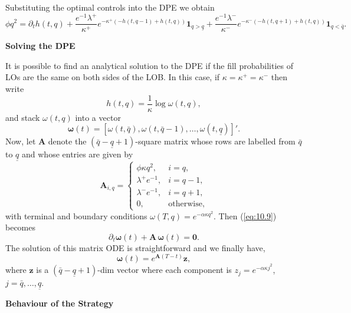 \documentclass[11pt, a4paper]{book}
\newcommand{\Ind}{\mathbf{1}}
\begin{document}
	Substituting the optimal controls into the DPE we obtain
	\begin{equation}
		\phi q^2 = \partial_t h(t, q) + \frac{e^{-1}\lambda^+}{\kappa^+} e^{-\kappa^+( -h(t,q-1)+h(t,q) )} \Ind_{q>\underline{q}} + \frac{e^{-1}\lambda^-}{\kappa^-} e^{-\kappa^-( -h(t,q+1)+h(t,q) )} \Ind_{q<\bar{q}}. \label{eq:10.9}
	\end{equation}
	
	\textbf{Solving the DPE}
	
	It is possible to find an analytical solution to the DPE if the fill probabilities of LOs are the same on both sides of the LOB. In this case, if $\kappa = \kappa^+ = \kappa^-$ then write
	\[
	h(t, q) = \frac{1}{\kappa} \log \omega(t, q),
	\]
	and stack $\omega(t, q)$ into a vector
	\[
	\bm{\omega}(t) = [\omega(t, \bar{q}), \omega(t, \bar{q}-1), \dots, \omega(t, \underline{q})]'.
	\]
	Now, let $\mathbf{A}$ denote the $(\bar{q} - \underline{q} + 1)$-square matrix whose rows are labelled from $\bar{q}$ to $\underline{q}$ and whose entries are given by
	\begin{equation}
		\mathbf{A}_{i,q} = \begin{cases}
			\phi \kappa q^2, & i = q, \\
			\lambda^+ e^{-1}, & i = q - 1, \\
			\lambda^- e^{-1}, & i = q + 1, \\
			0, & \text{otherwise},
		\end{cases} \label{eq:10.10}
	\end{equation}
	with terminal and boundary conditions $\omega(T, q) = e^{-\alpha \kappa q^2}$.
	Then (\ref{eq:10.9}) becomes
	\[
	\partial_t \bm{\omega}(t) + \mathbf{A} \, \bm{\omega}(t) = \mathbf{0}.
	\]
	The solution of this matrix ODE is straightforward and we finally have,
	\begin{equation}
		\boxed{\bm{\omega}(t) = e^{\mathbf{A}(T-t)} \mathbf{z},} \label{eq:10.11}
	\end{equation}
	where $\mathbf{z}$ is a $(\bar{q} - \underline{q} + 1)$-dim vector where each component is $z_j = e^{-\alpha \kappa j^2}$, $j = \bar{q}, \dots, \underline{q}$.
	
	\textbf{Behaviour of the Strategy}
	
\end{document}
